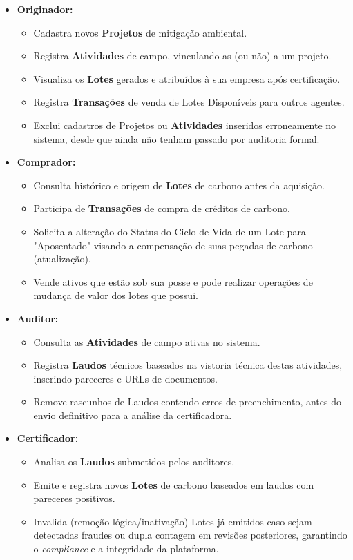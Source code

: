 \documentclass[12pt]{article}
\begin{document}
\begin{itemize}
    \item \textbf{Originador:}
    \begin{itemize}
        \item Cadastra novos \textbf{Projetos} de mitigação ambiental.
        \item Registra \textbf{Atividades} de campo, vinculando-as (ou não) a um projeto.
        \item Visualiza os \textbf{Lotes} gerados e atribuídos à sua empresa após certificação.
        \item Registra \textbf{Transações} de venda de Lotes Disponíveis para outros agentes.
        \item {Exclui} cadastros de {Projetos} ou \textbf{Atividades} inseridos erroneamente no sistema, desde que ainda não tenham passado por auditoria formal.
    \end{itemize}
    
    \item \textbf{Comprador:}
    \begin{itemize}
        \item Consulta histórico e origem de \textbf{Lotes} de carbono antes da aquisição.
        \item Participa de \textbf{Transações} de compra de créditos de carbono.
        \item Solicita a alteração do Status do Ciclo de Vida de um Lote para "Aposentado" visando a compensação de suas pegadas de carbono (atualização).
        \item Vende ativos que estão sob sua posse e pode realizar operações de mudança de valor dos lotes que possui. 
    \end{itemize}

    \item \textbf{Auditor:}
    \begin{itemize}
        \item Consulta as \textbf{Atividades} de campo ativas no sistema.
        \item Registra \textbf{Laudos} técnicos baseados na vistoria técnica destas atividades, inserindo pareceres e URLs de documentos.
        \item {Remove} rascunhos de {Laudos} contendo erros de preenchimento, antes do envio definitivo para a análise da certificadora.
    \end{itemize}

    \item \textbf{Certificador:}
    \begin{itemize}
        \item Analisa os \textbf{Laudos} submetidos pelos auditores.
        \item Emite e registra novos \textbf{Lotes} de carbono baseados em laudos com pareceres positivos.
        \item {Invalida (remoção lógica/inativação)} {Lotes} já emitidos caso sejam detectadas fraudes ou dupla contagem em revisões posteriores, garantindo o \textit{compliance} e a integridade da plataforma.
    \end{itemize}
\end{itemize}
\end{document}

